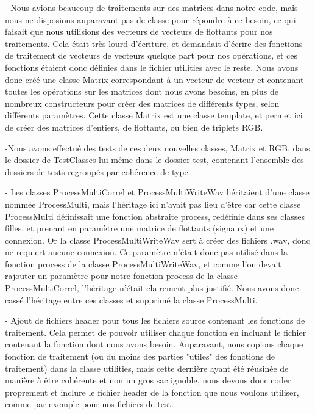   - Nous avions beaucoup de traitements sur des matrices dans notre code, mais
  nous ne disposions auparavant pas de classe pour répondre à ce besoin, ce qui
  faisait que nous utilisions des vecteurs de vecteurs de flottants pour nos
  traitements. Cela était très lourd d'écriture, et demandait d'écrire des
  fonctions de traitement de vecteurs de vecteurs quelque part pour nos
  opérations, et ces fonctions étaient donc définies dans le fichier utilities
  avec le reste. Nous avons donc créé une classe Matrix correspondant à un
  vecteur de vecteur et contenant toutes les opérations sur les matrices dont
  nous avons besoins, en plus de nombreux constructeurs pour créer des matrices
  de différents types, selon différents paramètres. Cette classe Matrix est une
  classe template, et permet ici de créer des matrices d'entiers, de flottants,
  ou bien de triplets RGB.

  -Nous avons effectué des tests de ces deux nouvelles classes, Matrix et RGB,
  dans le dossier de TestClasses lui même dans le dossier test, contenant
  l'ensemble des dossiers de tests regroupés par cohérence de type.

  - Les classes ProcessMultiCorrel et ProcessMultiWriteWav héritaient d'une
  classe nommée ProcessMulti, mais l'héritage ici n'avait pas lieu d'être car
  cette classe ProcessMulti définissait une fonction abstraite process,
  redéfinie dans ses classes filles, et prenant en paramètre une matrice de
  flottants (signaux) et une connexion. Or la classe ProcessMultiWriteWav sert
  à créer des fichiers .wav, donc ne requiert aucune connexion. Ce paramètre
  n'était donc pas utilisé dans la fonction process de la classe
  ProcessMultiWriteWav, et comme l'on devait rajouter un paramètre pour notre
  fonction process de la classe ProcessMultiCorrel, l'héritage n'était
  clairement plus justifié. Nous avons donc cassé l'héritage entre ces classes
  et supprimé la classe ProcessMulti.

  - Ajout de fichiers header pour tous les fichiers source contenant les
  fonctions de traitement. Cela permet de pouvoir utiliser chaque fonction en
  incluant le fichier contenant la fonction dont nous avons besoin. Auparavant,
  nous copions chaque fonction de traitement (ou du moins des parties "utiles"
  des fonctions de traitement) dans la classe utilities, mais cette dernière
  ayant été réusinée de manière à être cohérente et non un gros sac ignoble,
  nous devons donc coder proprement et inclure le fichier header de la fonction
  que nous voulons utiliser, comme par exemple pour nos fichiers de test.

